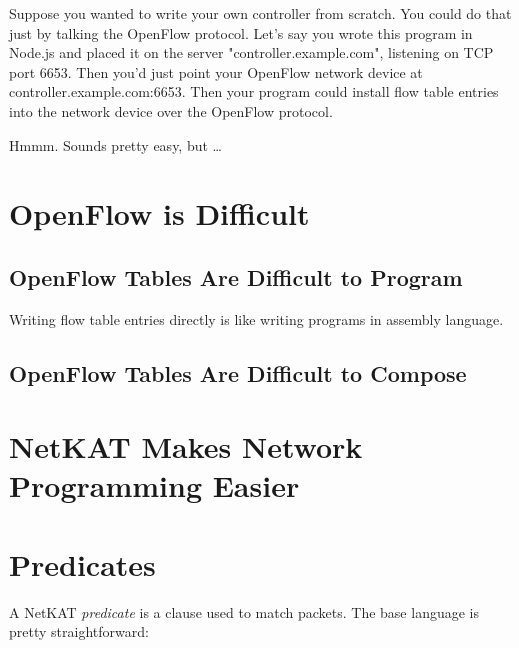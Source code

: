 Suppose you wanted to write your own controller from scratch.  
You could do that just by talking the OpenFlow protocol.
Let's say you wrote this program in Node.js and placed it on the server "controller.example.com", 
listening on TCP port 6653.
Then you'd just point your OpenFlow network device at controller.example.com:6653.
Then your program could install flow table entries into the network device over the OpenFlow protocol.

Hmmm.
Sounds pretty easy, but \ldots

\section{OpenFlow is Difficult}

\subsection{OpenFlow Tables Are Difficult to Program}

Writing flow table entries directly is like writing programs in assembly language.

\subsection{OpenFlow Tables Are Difficult to Compose}

\section{NetKAT Makes Network Programming Easier}

\section{Predicates}

A NetKAT \textit{predicate} is a clause used to match packets.
The base language is pretty straightforward:

